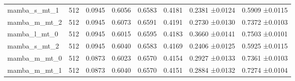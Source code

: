 \begin{tabular}{lccccccc}
mamba\_s\_mt\_1 & 512 & 0.0945 & 0.6056 & 0.6583 & 0.4181 & 0.2381 ±0.0124 & 0.5909 ±0.0115 \\
mamba\_m\_mt\_2 & 512 & 0.0945 & 0.6073 & 0.6591 & 0.4191 & 0.2730 ±0.0130 & 0.7372 ±0.0103 \\
mamba\_l\_mt\_0 & 512 & 0.0945 & 0.6015 & 0.6595 & 0.4183 & 0.3660 ±0.0141 & 0.7503 ±0.0101 \\
mamba\_s\_mt\_2 & 512 & 0.0945 & 0.6040 & 0.6583 & 0.4169 & 0.2406 ±0.0125 & 0.5925 ±0.0115 \\
mamba\_m\_mt\_0 & 512 & 0.0873 & 0.6023 & 0.6570 & 0.4154 & 0.2927 ±0.0133 & 0.7361 ±0.0103 \\
mamba\_m\_mt\_1 & 512 & 0.0873 & 0.6040 & 0.6570 & 0.4151 & 0.2884 ±0.0132 & 0.7274 ±0.0104 \\
\bottomrule
\end{tabular}
